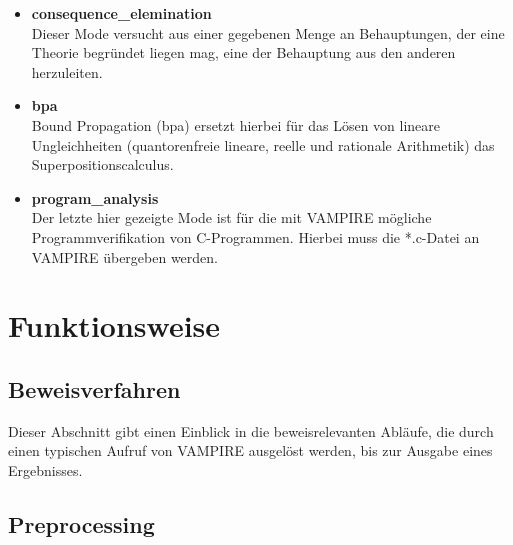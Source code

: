 \documentclass{article}
\begin{document}
\begin{itemize}
	\item \textbf{consequence\_elemination} \\
	Dieser Mode versucht aus einer gegebenen Menge an Behauptungen, der eine Theorie begründet liegen mag, eine der Behauptung aus den anderen herzuleiten.\\
	\item \textbf{bpa} \\
	Bound Propagation (bpa) ersetzt hierbei für das Lösen von lineare Ungleichheiten (quantorenfreie lineare, reelle und rationale Arithmetik) das Superpositionscalculus.
	\item \textbf{program\_analysis} \\
	Der letzte hier gezeigte Mode ist für die mit VAMPIRE mögliche Programmverifikation von C-Programmen. Hierbei muss die *.c-Datei an VAMPIRE übergeben werden.
\end{itemize}







\section{Funktionsweise}
\label{sec:mechanics}

\subsection{Beweisverfahren}
\label{subsec:proofmech}

Dieser Abschnitt gibt einen Einblick in die beweisrelevanten Abläufe, die durch einen typischen Aufruf von VAMPIRE ausgelöst werden, bis zur Ausgabe eines Ergebnisses.


\subsection{Preprocessing}
\label{subsec:preprocessing}
\end{document}
